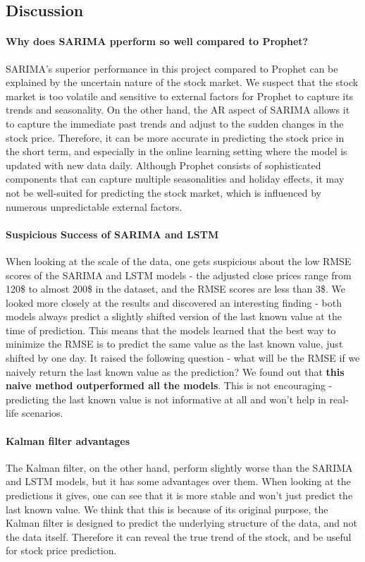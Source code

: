 \documentclass[12pt]{article}
\theoremstyle{definition}
\begin{document}
\subsection{Discussion}

\paragraph{Why does SARIMA pperform so well compared to Prophet?} 
SARIMA's superior performance in this project compared to Prophet can be explained by the uncertain nature of the stock market.
We suspect that the stock market is too volatile and sensitive to external factors for Prophet to capture its trends and seasonality.
On the other hand, the AR aspect of SARIMA allows it to capture the immediate past trends and adjust to the sudden changes in the stock price.
Therefore, it can be more accurate in predicting the stock price in the short term, and especially in the online learning setting where the model is updated with new data daily.
Although Prophet consists of sophisticated components that can capture multiple seasonalities and holiday effects, it may not be well-suited for predicting the stock market, which is influenced by numerous unpredictable external factors.

\paragraph{Suspicious Success of SARIMA and LSTM}
When looking at the scale of the data, one gets suspicious about the low RMSE scores of the SARIMA and LSTM models - the adjusted close prices range from 120\$ to almost 200\$ in the dataset, and the RMSE scores are less than 3\$.
We looked more closely at the results and discovered an interesting finding - both models always predict a slightly shifted version of the last known value at the time of prediction.
This means that the models learned that the best way to minimize the RMSE is to predict the same value as the last known value, just shifted by one day.
It raised the following question - what will be the RMSE if we naively return the last known value as the prediction? We found out that \textbf{this naive method outperformed all the models}. 
This is not encouraging - predicting the last known value is not informative at all and won't help in real-life scenarios.

\paragraph{Kalman filter advantages}
The Kalman filter, on the other hand, perform slightly worse than the SARIMA and LSTM models, but it has some advantages over them.
When looking at the predictions it gives, one can see that it is more stable and won't just predict the last known value.
We think that this is because of its original purpose, the Kalman filter is designed to predict the underlying structure of the data, and not the data itself.
Therefore it can reveal the true trend of the stock, and be useful for stock price prediction.
\end{document}
